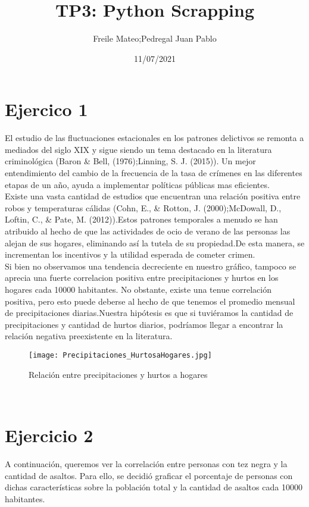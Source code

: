 \documentclass{article}
\title{TP3: Python Scrapping}
\author{Freile Mateo;Pedregal Juan Pablo }
\date{11/07/2021}
\begin{document}
\maketitle

\section{Ejercico 1}

El estudio de las fluctuaciones estacionales en los patrones delictivos se remonta a mediados del siglo XIX y sigue siendo un tema destacado en la literatura criminológica (Baron & Bell, (1976);Linning, S. J. (2015)). Un mejor entendimiento del cambio de la frecuencia de la tasa de crímenes en las diferentes etapas de un año, ayuda a implementar políticas públicas mas eficientes.\\

Existe una vasta cantidad de estudios que encuentran una relación positiva entre robos y temperaturas cálidas (Cohn, E., & Rotton, J. (2000);McDowall, D., Loftin, C., & Pate, M. (2012)).Estos patrones temporales a menudo se han atribuido al hecho de que las actividades de ocio de verano de las personas las alejan de sus hogares, eliminando así la tutela de su propiedad.De esta manera, se incrementan los incentivos y la utilidad esperada de cometer crimen.\\

Si bien no observamos una  tendencia decreciente en nuestro gráfico, tampoco se aprecia una fuerte correlacion positiva entre precipitaciones y hurtos en los hogares cada 10000 habitantes. No obstante, existe una tenue  correlación positiva, pero esto puede deberse al hecho de que tenemos  el promedio mensual de precipitaciones diarias.Nuestra hipótesis es que si tuviéramos la cantidad de precipitaciones y cantidad de hurtos diarios, podríamos llegar a encontrar la relación negativa preexistente en la literatura.\\



\begin{figure}[htbp]
\centerline{\texttt{[image: Precipitaciones\_HurtosaHogares.jpg]}}
\caption{Relación entre precipitaciones y hurtos a hogares}
\label{fig}
\end{figure}\\






\section{Ejercicio 2}
A continuación, queremos ver la correlación entre personas con tez negra y la cantidad de asaltos. Para ello, se  decidió graficar el porcentaje de personas con dichas  características sobre la población total y la cantidad de asaltos cada 10000 habitantes.\\
\end{document}
